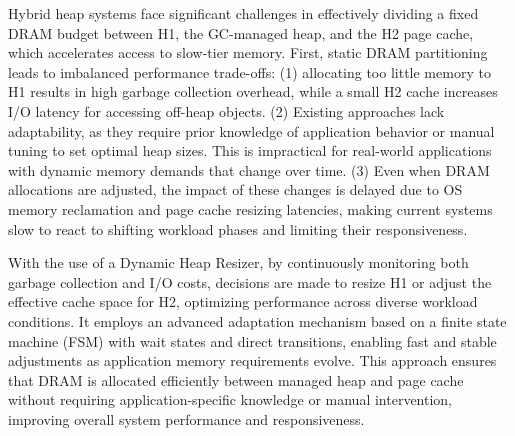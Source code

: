 Hybrid heap systems face significant challenges in effectively dividing a fixed DRAM budget between H1, the GC-managed heap, and the H2 page cache, which accelerates access to slow-tier memory. First, static DRAM partitioning leads to imbalanced performance trade-offs: (1) allocating too little memory to H1 results in high garbage collection overhead, while a small H2 cache increases I/O latency for accessing off-heap objects. (2) Existing approaches lack adaptability, as they require prior knowledge of application behavior or manual tuning to set optimal heap sizes. This is impractical for real-world applications with dynamic memory demands that change over time. (3) Even when DRAM allocations are adjusted, the impact of these changes is delayed due to OS memory reclamation and page cache resizing latencies, making current systems slow to react to shifting workload phases and limiting their responsiveness.

With the use of a Dynamic Heap Resizer, by continuously monitoring both garbage collection and I/O costs, decisions are made to resize H1 or adjust the effective cache space for H2, optimizing performance across diverse workload conditions. It employs an advanced adaptation mechanism based on a finite state machine (FSM) with wait states and direct transitions, enabling fast and stable adjustments as application memory requirements evolve. This approach ensures that DRAM is allocated efficiently between managed heap and page cache without requiring application-specific knowledge or manual intervention, improving overall system performance and responsiveness.


